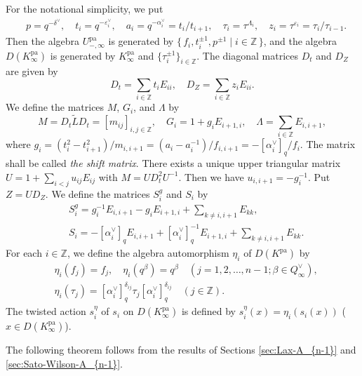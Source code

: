 \documentclass[12pt,twoside]{article}
\newcommand\tL{{\widetilde L}}
\newcommand\hs{s^\eta}
\newcommand\av{\alpha^\vee}
\newcommand\eps{\varepsilon}
\newcommand\epsv{\eps^\vee}
\newcommand\deltav{\delta^\vee}
\newcommand\Qv{Q^\vee}
\newcommand\pa{{\mathrm{pa}}}
\newcommand\Z{{\mathbb Z}} %
\theoremstyle{plain} %
\theoremstyle{definition} %
\theoremstyle{definition} %
\numberwithin{theorem}{section}
\numberwithin{equation}{section}
\numberwithin{figure}{section}
\numberwithin{table}{section}
\begin{document}
For the notational simplicity, we put
\begin{align*}
 &
 p=q^{-\deltav}, \quad 
 t_i = q^{-\epsv_i}, \quad 
 a_i = q^{-\av_i} = t_i/t_{i+1}, \quad
 \tau_i = \tau^{\Lambda_i}, \quad
 z_i = \tau^{\eps_i} = \tau_i/\tau_{i-1}.
\end{align*}
Then the algebra $U_{-,\infty}^\pa$ is generated 
by $\{\,f_i,t_i^{\pm1},p^{\pm1}\mid i\in\Z\,\}$,
and the algebra $D(K_\infty^\pa)$ is generated by $K_\infty^\pa$
and $\{\tau_i^{\pm1}\}_{i\in\Z}$.
The diagonal matrices $D_t$ and $D_Z$ are given by
\begin{equation*}
 D_t = \sum_{i\in\Z} t_i E_{ii}, \quad
 D_Z = \sum_{i\in\Z} z_i E_{ii}.
\end{equation*}  
We define the matrices $M$, $G_i$, and $\Lambda$ by
\begin{equation}
 M = D_t \tL D_t = [m_{ij}]_{i,j\in\Z}, \quad
 G_i = 1 + g_i E_{i+1,i}, \quad
 \Lambda = \sum_{i\in\Z} E_{i,i+1},
 \label{eq:M-G_i-Lambda}
\end{equation}
where \(
 g_i 
 = (t_i^2-t_{i+1}^2)/m_{i,i+1} 
 = (a_i-a_i^{-1})/f_{i,i+1} 
 = -[\av_i]_q/f_i
\). 
The matrix shall be called {\em the shift matrix}.
There exists a unique upper triangular matrix 
$U=1+\sum_{i<j}u_{ij}E_{ij}$ with $M=UD_t^2U^{-1}$.
Then we have $u_{i,i+1}=-g_i^{-1}$. 
Put $Z=U D_Z$.
We define the matrices $S_i^g$ and $S_i$ by
\begin{align*}
 &
 S_i^g = g_i^{-1} E_{i,i+1} - g_i E_{i+1,i} 
       + \sum_{k\ne i,i+1} E_{kk},
 \\ &
 S_i = -[\av_i]_q E_{i,i+1} + [\av_i]_q^{-1} E_{i+1,i}
     + \sum_{k\ne i,i+1} E_{kk}.
\end{align*}
For each $i\in\Z$, we define the algebra automorphism $\eta_i$ 
of $D(K^\pa)$ by
\begin{align*}
 &
 \eta_i(f_j)=f_j, \quad 
 \eta_i(q^\beta) = q^\beta
 \quad (j=1,2,\ldots,n-1; \beta\in\Qv_\infty),
 \\ &
 \eta_i(\tau_j) = [\av_i]_q^{\delta_{ij}} \tau_j [\av_i]_q^{\delta_{ij}}
 \quad (j\in\Z).
\end{align*}
The twisted action $\hs_i$ of $s_i$ on $D(K_\infty^\pa)$ 
is defined by $\hs_i(x) = \eta_i(s_i(x))$ ($x\in D(K_\infty^\pa)$).

The following theorem follows from the results of 
Sections \ref{sec:Lax-A_{n-1}} and \ref{sec:Sato-Wilson-A_{n-1}}.
\end{document}
